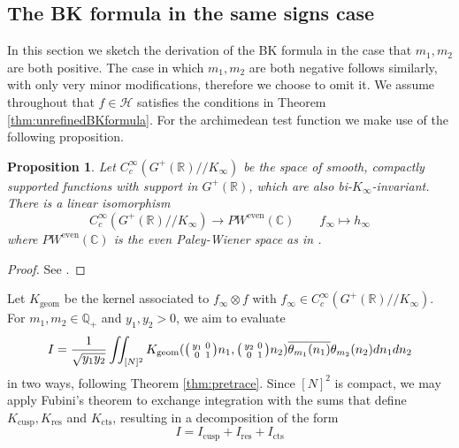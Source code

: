 \documentclass{article}
\newtheorem{proposition}[theorem]{Proposition}
\numberwithin{equation}{section}
\begin{document}
\subsection{The BK formula in the same signs case}\label{section:same-sign}
In this section we sketch the derivation of the BK formula in the case that $m_1,m_2$ are both positive. The case in which $m_1,m_2$ are both negative follows similarly, with only very minor modifications, therefore we choose to omit it. We assume throughout that $f \in \mathcal{H}$ satisfies the conditions in Theorem \ref{thm:unrefinedBKformula}. For the archimedean test function we make use of the following proposition.

\begin{proposition}\label{prop:paley-wiener-isom}
    Let $C^\infty_c(G^+(\mathbb{R})//K_\infty)$ be the space of smooth, compactly supported functions with support in $G^+(\mathbb{R})$, which are also bi-$K_\infty$-invariant. There is a linear isomorphism
    $$ C_c^\infty(G^+(\mathbb{R})//K_\infty) \longrightarrow PW^{\operatorname{even}}(\mathbb{C}) \qquad f_\infty \longmapsto h_\infty$$
    where $PW^{\operatorname{even}}(\mathbb{C})$ is the even Paley-Wiener space as in \cite[\S 3.3]{KL-kuznetsov}.
\end{proposition}
\begin{proof}
    See \cite[Proposition 3.6]{KL-kuznetsov}.
\end{proof}

Let $K_{\operatorname{geom}}$ be the kernel associated to $f_\infty\otimes f$ with $f_\infty\in C_c^\infty(G^+(\mathbb{R})//K_\infty) $. For $m_1,m_2 \in \mathbb{Q}_+$ and $y_1,y_2 >0$, we aim to evaluate 
\begin{equation}
    I = \frac{1}{\sqrt{y_1y_2}}\iint_{[N]^2}K_\text{geom}(\begin{psmallmatrix}
        y_1 & 0 \\ 0 & 1
    \end{psmallmatrix}n_1,\begin{psmallmatrix}
        y_2 & 0 \\ 0 & 1
    \end{psmallmatrix}n_2)\overline{\theta_{m_1}(n_1)}\theta_{m_2}(n_2)dn_1dn_2
\end{equation}
in two ways, following Theorem \ref{thm:pretrace}. Since $[N]^2$ is compact, we may apply Fubini's theorem to exchange integration with the sums that define $K_\text{cusp}, K_\text{res}$ and $K_\text{cts}$, resulting in a decomposition of the form
\begin{equation}\label{eq:decomposition}
    I = I_\text{cusp}+I_\text{res}+I_\text{cts}
\end{equation}
\end{document}
